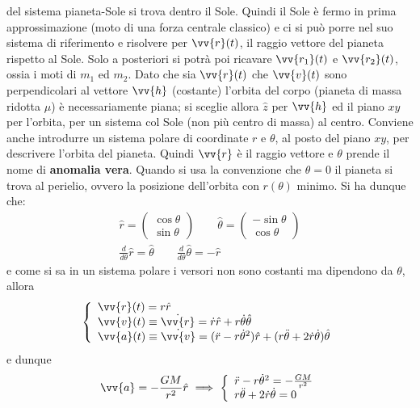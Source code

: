 \documentclass[a4paper, oneside]{book}
\begin{document}
del sistema pianeta-Sole si trova dentro il Sole. Quindi il Sole è fermo in prima 
approssimazione (moto di una forza centrale classico) e ci si può porre nel suo sistema
di riferimento e risolvere per $\vv{r}(t)$, il raggio vettore del pianeta rispetto al Sole. 
Solo a posteriori si potrà poi ricavare $\vv{r_1}(t)$ e $\vv{r_2}(t)$, ossia i moti di $m_1$ ed $m_2$.  
Dato che sia $\vv{r}(t)$ che $\vv{v}(t)$ sono perpendicolari al vettore $\vv{h}$ (costante)
l'orbita del corpo (pianeta di massa ridotta $\mu$) è necessariamente piana; 
si sceglie allora $\hat{z}$ per $\vv{h}$ ed il piano $xy$ per l'orbita, per un sistema col Sole (non più
centro di massa) al centro. Conviene anche introdurre un sistema polare 
di coordinate $r$ e $\theta$, al posto del piano $xy$, per descrivere l'orbita del pianeta. Quindi $\vv{r}$ è il raggio vettore
e $\theta$ prende il nome di \textbf{anomalia vera}.
Quando si usa la convenzione che $\theta = 0 $ il pianeta si trova al perielio, ovvero la posizione 
dell'orbita con $r(\theta)$ minimo. Si ha dunque che:
\begin{gather*}
    \hat{r} = \begin{pmatrix} \cos\theta \\
    \sin\theta \end{pmatrix} \qquad
    \hat{\theta} = \begin{pmatrix} -\sin\theta \\
    \cos\theta \end{pmatrix}  \\
    \frac{d}{d\theta} \hat{r} = \hat{\theta} \qquad \frac{d}{d\theta } \hat{\theta} = - \hat{r}    
\end{gather*}
e come si sa in un sistema polare i versori non sono costanti 
ma dipendono da $\theta$, allora 
\begin{gather*}
    \left\{\begin{array}{l}
        \vv{r}(t) = r\hat{r} \\
        \vv{v}(t) \equiv \dot{\vv{r} } = \dot{r}\hat{r} + r\dot{\theta} \hat{\theta} \\
        \vv{a}(t) \equiv \dot{\vv{v} } = (\ddot{r} - r\dot{\theta}^{2}  ) \hat{r} + (r\ddot{\theta} + 2\dot{r}\dot{\theta}  ) \hat{\theta}             
    \end{array}\right.
\end{gather*}
e dunque 
\begin{gather*}
    \vv{a} = -\frac{GM}{r^{2}} \hat{r} \ \Longrightarrow \ \left\{\begin{array}{l}
        \ddot{r} - r\dot{\theta}^{2} = -\frac{GM}{r^{2}} \\
        r\ddot{\theta} + 2\dot{r} \dot{\theta} = 0     
    \end{array}\right.  
\end{gather*}
\end{document}
